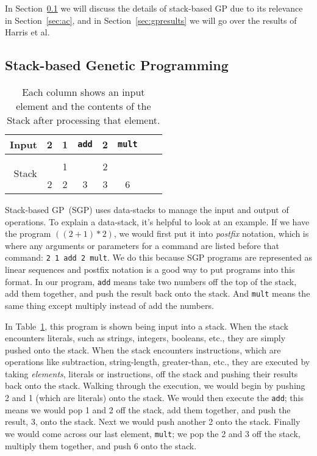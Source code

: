 \documentclass{sig-alternate}
\begin{document}
In Section~\ref{sec:sgp} we will discuss the details of stack-based GP due to its relevance in Section~\ref{sec:ac}, and in Section~\ref{sec:gpresults} we will go over the results of Harris et al.

\subsection{Stack-based Genetic Programming}
\label{sec:sgp}
\begin{table}
	\centering
	\begin{tabular}{|r|c|c|c|c|c|c|c|}
		\hline
		Input & 2 & 1 & \texttt{add} & 2 & \texttt{mult} \\
		\hline
		\multirow{3}{*}{Stack} & & & & &\\
		&   & 1 &   & 2 &   \\
		& 2 & 2 & 3 & 3 & 6 \\
		\hline
	\end{tabular}
	\caption{Each column shows an input element and the contents of the Stack after processing that element.}
	\label{tab:stacks}
\end{table}

Stack-based GP~(SGP) uses data-stacks to manage the input and output of operations. To explain a data-stack, it's helpful to look at an example. If we have the program $((2+1)*2)$, we would first put it into \textit{postfix} notation, which is where any arguments or parameters for a command are listed before that command: \texttt{2~1~add~2~mult}. We do this because SGP programs are represented as linear sequences and postfix notation is a good way to put programs into this format. In our program, \texttt{add} means take two numbers off the top of the stack, add them together, and push the result back onto the stack. And \texttt{mult} means the same thing except multiply instead of add the numbers.

In Table~\ref{tab:stacks}, this program is shown being input into a stack. When the stack encounters literals, such as strings, integers, booleans, etc., they are simply pushed onto the stack. When the stack encounters instructions, which are operations like subtraction, string-length, greater-than, etc., they are executed by taking \textit{elements}, literals or instructions, off the stack and pushing their results back onto the stack. Walking through the execution, we would begin by pushing 2 and 1 (which are literals) onto the stack. We would then execute the \texttt{add}; this means we would pop 1 and 2 off the stack, add them together, and push the result, 3, onto the stack. Next we would push another 2 onto the stack. Finally we would come across our last element, \texttt{mult}; we pop the 2 and 3 off the stack, multiply them together, and push 6 onto the stack.
\end{document}
